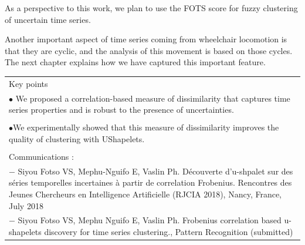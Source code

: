 As a perspective to this work, we plan to use the FOTS score for fuzzy clustering of uncertain time series. 


 Another important aspect of time series coming from wheelchair locomotion is that they are cyclic, and the analysis of this movement is based on those cycles. The next chapter explains how we have captured this important feature.


\begin{table}[ht]
\centering
\begin{tabular}{|p{15cm}|}

\hline
\rowcolor{LavenderBlush}
Key points\\
$\bullet$ We proposed a correlation-based measure of dissimilarity that captures time series properties and is robust to the presence of uncertainties. \\
\\
$\bullet$We experimentally showed that this measure of dissimilarity improves the quality of clustering with UShapelets.\\ 
\\
Communications :\\
$-$ Siyou Fotso VS, Mephu-Nguifo E, Vaslin Ph. Découverte d'u-shpalet sur des séries temporelles incertaines à partir de correlation Frobenius. Rencontres des Jeunes Chercheurs en Intelligence Artificielle (RJCIA 2018), Nancy, France, July 2018\\
$-$ Siyou Fotso VS, Mephu Nguifo E, Vaslin Ph. Frobenius correlation based u-shapelets discovery for time series clustering., Pattern Recognition (submitted)\\
\hline
\end{tabular}
\end{table}